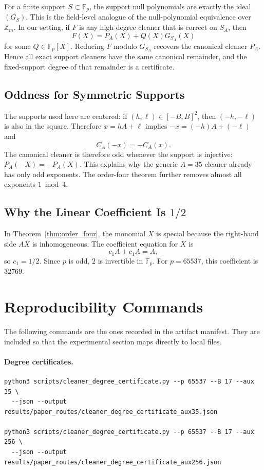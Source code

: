 \documentclass[a4paper,runningheads]{llncs}
\newcommand{\Fp}{\mathbb{F}_p}
\newcommand{\ZZ}{\mathbb{Z}}
\begin{document}
For a finite support $S\subset\Fp$, the support null polynomials are exactly
the ideal $(G_S)$.  This is the field-level analogue of the null-polynomial
equivalence over $\ZZ_m$.  In our setting, if $F$ is any high-degree cleaner
that is correct on $S_A$, then
\[
  F(X)=P_A(X)+Q(X)G_{S_A}(X)
\]
for some $Q\in\Fp[X]$.  Reducing $F$ modulo $G_{S_A}$ recovers the canonical
cleaner $P_A$.  Hence all exact support cleaners have the same canonical
remainder, and the fixed-support degree of that remainder is a certificate.

\subsection{Oddness for Symmetric Supports}

The supports used here are centered: if $(h,\ell)\in[-B,B]^2$, then
$(-h,-\ell)$ is also in the square.  Therefore $x=hA+\ell$ implies
$-x=(-h)A+(-\ell)$ and
\[
  C_A(-x)=-C_A(x).
\]
The canonical cleaner is therefore odd whenever the support is injective:
$P_A(-X)=-P_A(X)$.  This explains why the generic $A=35$ cleaner already has
only odd exponents.  The order-four theorem further removes almost all
exponents $1\bmod4$.

\subsection{Why the Linear Coefficient Is $1/2$}

In Theorem~\ref{thm:order_four}, the monomial $X$ is special because the
right-hand side $AX$ is inhomogeneous.  The coefficient equation for $X$ is
\[
  c_1A+c_1A=A,
\]
so $c_1=1/2$.  Since $p$ is odd, $2$ is invertible in $\Fp$.  For
$p=65537$, this coefficient is $32769$.

\section{Reproducibility Commands}
\label{app:commands}

The following commands are the ones recorded in the artifact manifest.  They
are included so that the experimental section maps directly to local files.

\paragraph{Degree certificates.}
\begin{verbatim}
python3 scripts/cleaner_degree_certificate.py --p 65537 --B 17 --aux 35 \
  --json --output results/paper_routes/cleaner_degree_certificate_aux35.json

python3 scripts/cleaner_degree_certificate.py --p 65537 --B 17 --aux 256 \
  --json --output results/paper_routes/cleaner_degree_certificate_aux256.json
\end{verbatim}
\end{document}
